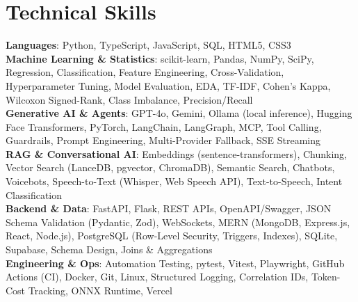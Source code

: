 \documentclass[letterpaper,10pt]{article}
\begin{document}
\section{Technical Skills}
 \begin{itemize}[leftmargin=0.15in, label={}]
    \small{\item{
     \textbf{Languages}{: Python, TypeScript, JavaScript, SQL, HTML5, CSS3} \\
     \textbf{Machine Learning \& Statistics}{: scikit-learn, Pandas, NumPy, SciPy, Regression,
       Classification, Feature Engineering, Cross-Validation, Hyperparameter Tuning, Model Evaluation,
       EDA, TF-IDF, Cohen's Kappa, Wilcoxon Signed-Rank, Class Imbalance, Precision/Recall} \\
     \textbf{Generative AI \& Agents}{: GPT-4o, Gemini, Ollama (local inference), Hugging Face
       Transformers, PyTorch, LangChain, LangGraph, MCP, Tool Calling, Guardrails,
       Prompt Engineering, Multi-Provider Fallback, SSE Streaming} \\
     \textbf{RAG \& Conversational AI}{: Embeddings (sentence-transformers), Chunking, Vector Search
       (LanceDB, pgvector, ChromaDB), Semantic Search, Chatbots, Voicebots, Speech-to-Text (Whisper,
       Web Speech API), Text-to-Speech, Intent Classification} \\
     \textbf{Backend \& Data}{: FastAPI, Flask, REST APIs, OpenAPI/Swagger, JSON Schema Validation
       (Pydantic, Zod), WebSockets, MERN (MongoDB, Express.js, React, Node.js), PostgreSQL
       (Row-Level Security, Triggers, Indexes), SQLite, Supabase, Schema Design, Joins \& Aggregations} \\
     \textbf{Engineering \& Ops}{: Automation Testing, pytest, Vitest, Playwright, GitHub Actions (CI),
       Docker, Git, Linux, Structured Logging, Correlation IDs, Token-Cost Tracking, ONNX Runtime,
       Vercel}
    }}
 \end{itemize}

\end{document}
